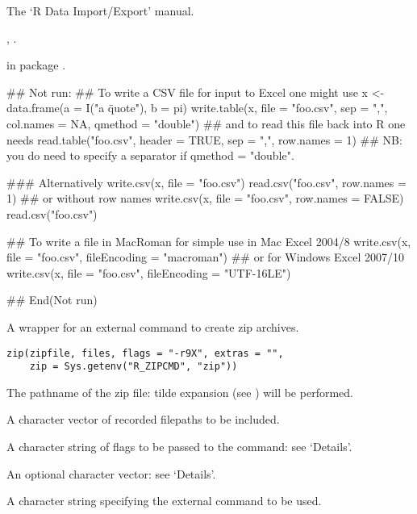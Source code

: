 %
\begin{SeeAlso}\relax
The `R Data Import/Export' manual.

, .

 in package .
\end{SeeAlso}
%
\begin{Examples}
\begin{ExampleCode}
## Not run: 
## To write a CSV file for input to Excel one might use
x <- data.frame(a = I("a \" quote"), b = pi)
write.table(x, file = "foo.csv", sep = ",", col.names = NA,
            qmethod = "double")
## and to read this file back into R one needs
read.table("foo.csv", header = TRUE, sep = ",", row.names = 1)
## NB: you do need to specify a separator if qmethod = "double".

### Alternatively
write.csv(x, file = "foo.csv")
read.csv("foo.csv", row.names = 1)
## or without row names
write.csv(x, file = "foo.csv", row.names = FALSE)
read.csv("foo.csv")

## To write a file in MacRoman for simple use in Mac Excel 2004/8
write.csv(x, file = "foo.csv", fileEncoding = "macroman")
## or for Windows Excel 2007/10
write.csv(x, file = "foo.csv", fileEncoding = "UTF-16LE")

## End(Not run)
\end{ExampleCode}
\end{Examples}
%
\begin{Description}\relax
A wrapper for an external  command to create zip archives.
\end{Description}
%
\begin{Usage}
\begin{verbatim}
zip(zipfile, files, flags = "-r9X", extras = "",
    zip = Sys.getenv("R_ZIPCMD", "zip"))
\end{verbatim}
\end{Usage}
%
\begin{Arguments}
\begin{ldescription}
\item[\code{zipfile}] The pathname of the zip file: tilde expansion (see
) will be performed.
\item[\code{files}] A character vector of recorded filepaths to be included.
\item[\code{flags}] A character string of flags to be passed to the command:
see `Details'.
\item[\code{extras}] An optional character vector: see `Details'.
\item[\code{zip}] A character string specifying the external command to be used.
\end{ldescription}
\end{Arguments}
